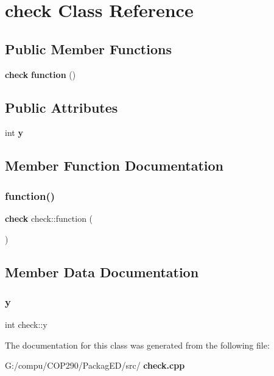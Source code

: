 \section{check Class Reference}
\label{classcheck}
\subsection*{Public Member Functions}
\begin{DoxyCompactItemize}
\item 
\textbf{ check} \textbf{ function} ()
\end{DoxyCompactItemize}
\subsection*{Public Attributes}
\begin{DoxyCompactItemize}
\item 
int \textbf{ y}
\end{DoxyCompactItemize}


\subsection{Member Function Documentation}
\mbox{\label{classcheck_aea4fe5c31fa6a2b8798e1fc5de71ec95}} 
\subsubsection{function()}
{\footnotesize\ttfamily \textbf{ check} check\+::function (\begin{DoxyParamCaption}{ }\end{DoxyParamCaption})}



\subsection{Member Data Documentation}
\mbox{\label{classcheck_acb8c9192a576a58bf4fb8cdbfc326271}} 
\subsubsection{y}
{\footnotesize\ttfamily int check\+::y}



The documentation for this class was generated from the following file\+:\begin{DoxyCompactItemize}
\item 
G\+:/compu/\+C\+O\+P290/\+Packag\+E\+D/src/\textbf{ check.\+cpp}\end{DoxyCompactItemize}
